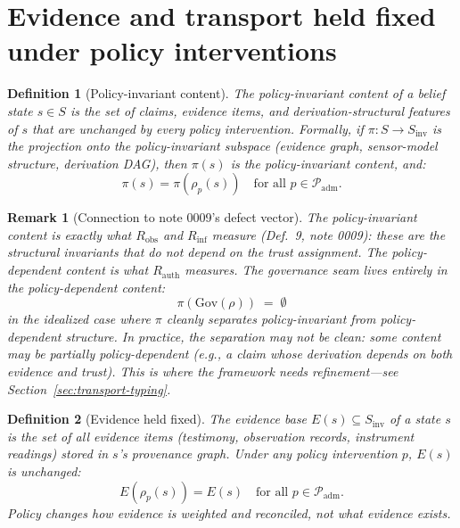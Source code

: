 \documentclass[11pt]{article}
\newtheorem{definition}{Definition}
\newtheorem{remark}{Remark}
\newcommand{\Gov}{\mathrm{Gov}}
\newcommand{\Padm}{\mathcal{P}_{\mathrm{adm}}}
\newcommand{\Robs}{R_{\mathrm{obs}}}
\newcommand{\Rinf}{R_{\mathrm{inf}}}
\newcommand{\Rauth}{R_{\mathrm{auth}}}
\begin{document}
\section{Evidence and transport held fixed under policy interventions}
\label{sec:evidence-transport}

\begin{definition}[Policy-invariant content]
\label{def:policy-invariant}
The \emph{policy-invariant content} of a belief state $s \in S$ is the set of claims, evidence
items, and derivation-structural features of $s$ that are unchanged by every policy
intervention. Formally, if $\pi : S \to S_{\mathrm{inv}}$ is the projection onto the
policy-invariant subspace (evidence graph, sensor-model structure, derivation DAG), then
$\pi(s)$ is the policy-invariant content, and:
\[
  \pi(s) = \pi(\rho_p(s)) \quad \text{for all } p \in \Padm.
\]
\end{definition}

\begin{remark}[Connection to note 0009's defect vector]
The policy-invariant content is exactly what $\Robs$ and $\Rinf$ measure (Def.~9, note 0009):
these are the structural invariants that do not depend on the trust assignment. The
policy-\emph{dependent} content is what $\Rauth$ measures. The governance seam lives entirely
in the policy-dependent content:
\[
  \pi(\Gov(\rho)) \;=\; \emptyset
\]
in the idealized case where $\pi$ cleanly separates policy-invariant from policy-dependent
structure. In practice, the separation may not be clean: some content may be partially
policy-dependent (e.g., a claim whose derivation depends on both evidence and trust). This
is where the framework needs refinement---see Section~\ref{sec:transport-typing}.
\end{remark}

\begin{definition}[Evidence held fixed]
\label{def:evidence-fixed}
The \emph{evidence base} $E(s) \subseteq S_{\mathrm{inv}}$ of a state $s$ is the set of all
evidence items (testimony, observation records, instrument readings) stored in $s$'s provenance
graph. Under any policy intervention $p$, $E(s)$ is unchanged:
\[
  E(\rho_p(s)) = E(s) \quad \text{for all } p \in \Padm.
\]
Policy changes how evidence is \emph{weighted} and \emph{reconciled}, not what evidence
\emph{exists}.
\end{definition}
\end{document}
